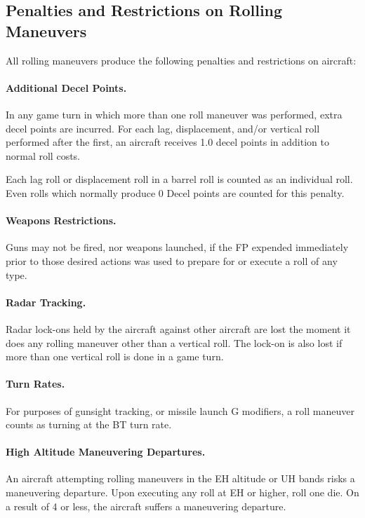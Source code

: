 \label{rule:sustained-rolling-maneuvers}

\subsection{Penalties and Restrictions on Rolling Maneuvers}

All rolling maneuvers produce the following penalties and restrictions on aircraft:

\paragraph{Additional Decel Points.} In any game turn in which more than one roll maneuver was performed, extra decel points are incurred. For each lag, displacement, and/or vertical roll performed after the first, an aircraft receives 1.0 decel points in addition to normal roll costs.

Each lag roll or displacement roll in a barrel roll is counted as an individual roll. Even rolls which normally produce 0 Decel points are counted for this penalty.

\paragraph{Weapons Restrictions.} Guns may not be fired, nor weapons launched, if the FP expended immediately prior to those desired actions was used to prepare for or execute a roll of any type.

\paragraph{Radar Tracking.} Radar lock-ons held by the aircraft against other aircraft are lost the moment it does any rolling maneuver other than a vertical roll. The lock-on is also lost if more than one vertical roll is done in a game turn.

\paragraph{Turn Rates.} For purposes of gunsight tracking, or missile launch G modifiers, a roll maneuver counts as turning at the BT turn rate.

\paragraph{High Altitude Maneuvering Departures.} An aircraft attempting rolling maneuvers in the EH altitude or UH bands risks a maneuvering departure. Upon executing any roll at EH or higher, roll one die. On a result of 4 or less, the aircraft suffers a maneuvering departure.

